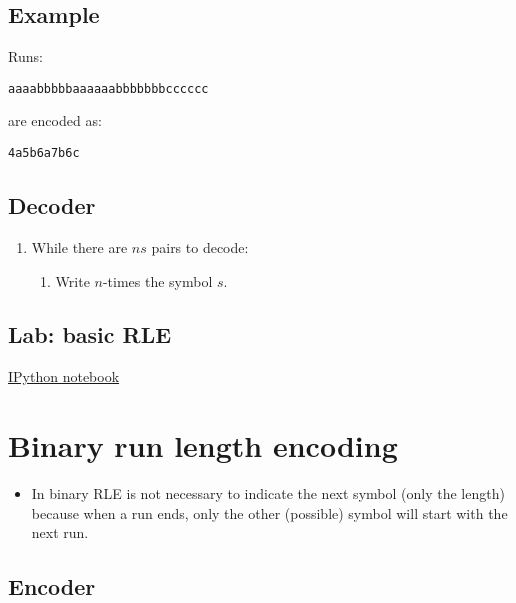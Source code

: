 \subsection{Example}

Runs:

\begin{verbatim}
aaaabbbbbaaaaaabbbbbbbcccccc
\end{verbatim}

are encoded as:

\begin{verbatim}
4a5b6a7b6c
\end{verbatim}

\subsection{Decoder}

\begin{enumerate}
\def\labelenumi{\arabic{enumi}.}
\tightlist
\item While there are \(ns\) pairs to decode:

  \begin{enumerate}
  \def\labelenumii{\arabic{enumii}.}
  \tightlist
  \item Write \(n\)-times the symbol \(s\).
  \end{enumerate}
\end{enumerate}

\subsection{Lab: basic RLE}
\href{https://nbviewer.jupyter.org/github/vicente-gonzalez-ruiz/Run-length_encoding/blob/master/RLE.ipynb}{IPython notebook}

\section{Binary run length encoding}

\begin{itemize}
  \tightlist
\item In binary RLE is not necessary to indicate the next symbol (only the
  length) because when a run ends, only the other (possible) symbol will
  start with the next run.
\end{itemize}

\subsection{Encoder}


